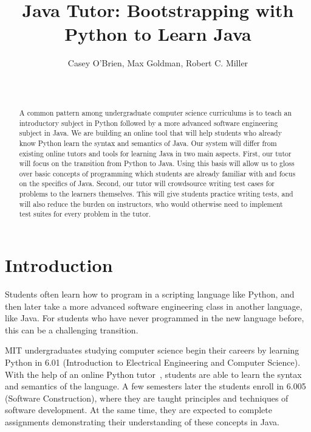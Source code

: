 \documentclass{sigchi}
\begin{document}
\title{Java Tutor: Bootstrapping with Python to Learn Java}

\author{
  \alignauthor Casey O'Brien, Max Goldman, Robert C. Miller\\
    \\
    \\
}

\maketitle

\begin{abstract}
A common pattern among undergraduate computer science curriculums is to teach an introductory subject in Python followed by a more advanced software engineering subject in Java. We are building an online tool that will help students who already know Python learn the syntax and semantics of Java. Our system will differ from existing online tutors and tools for learning Java in two main aspects. First, our tutor will focus on the transition from Python to Java. Using this basis will allow us to gloss over basic concepts of programming which students are already familiar with and focus on the specifics of Java. Second, our tutor will crowdsource writing test cases for problems to the learners themselves. This will give students practice writing tests, and will also reduce the burden on instructors, who would otherwise need to implement test suites for every problem in the tutor.
\end{abstract}

\section{Introduction}

Students often learn how to program in a scripting language like Python, and then later take a more advanced software engineering class in another language, like Java. For students who have never programmed in the new language before, this can be a challenging transition.

MIT undergraduates studying computer science begin their careers by learning Python in 6.01 (Introduction to Electrical Engineering and Computer Science). With the help of an online Python tutor~\cite{pythontutor}, students are able to learn the syntax and semantics of the language. A few semesters later the students enroll in 6.005 (Software Construction), where they are taught principles and techniques of software development. At the same time, they are expected to complete assignments demonstrating their understanding of these concepts in Java.
\end{document}
